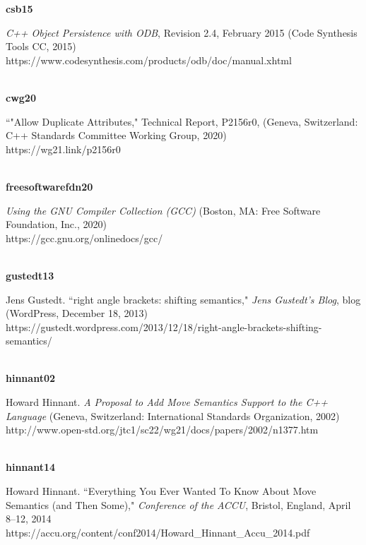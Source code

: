 \noindent\textbf{csb15}\\
\hspace*{2em}\parbox[t]{\textwidth}{\textit{C++ Object Persistence with ODB}, Revision 2.4, February 2015 (Code Synthesis Tools CC, 2015)\\
https://www.codesynthesis.com/products/odb/doc/manual.xhtml}\\

\noindent\textbf{cwg20}\\
\hspace*{2em}\parbox[t]{\textwidth}{``"Allow Duplicate Attributes," Technical Report, P2156r0, (Geneva, Switzerland: C++ Standards Committee Working Group, 2020)\\
https://wg21.link/p2156r0}\\

\newpage%
\noindent\textbf{freesoftwarefdn20}\\
\hspace*{2em}\parbox[t]{\textwidth}{\textit{Using the GNU Compiler Collection (GCC)} (Boston, MA: Free Software Foundation, Inc., 2020)\\
https://gcc.gnu.org/onlinedocs/gcc/}\\

\noindent\textbf{gustedt13}\\
\hspace*{2em}\parbox[t]{\textwidth}{Jens Gustedt. ``right angle brackets: shifting semantics,"  \textit{Jens Gustedt's Blog}, blog (WordPress, December 18, 2013)\\
https://gustedt.wordpress.com/2013/12/18/right-angle-brackets-shifting-semantics/}\\

\noindent\textbf{hinnant02}\\
\hspace*{2em}\parbox[t]{\textwidth}{Howard Hinnant. \textit{A Proposal to Add Move Semantics Support to the C++ Language} (Geneva, Switzerland: International Standards Organization, 2002)\\
http://www.open-std.org/jtc1/sc22/wg21/docs/papers/2002/n1377.htm}\\

\noindent\textbf{hinnant14}\\
\hspace*{2em}\parbox[t]{\textwidth}{Howard Hinnant. ``Everything You Ever Wanted To Know About Move Semantics (and Then Some)," \textit{Conference of the ACCU}, Bristol, England, April 8--12, 2014\\
https://accu.org/content/conf2014/Howard\_Hinnant\_Accu\_2014.pdf}\\

